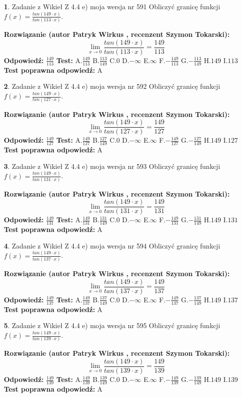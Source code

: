 \documentclass[12pt, a4paper]{article}
\theoremstyle{definition} %
\newtheorem{zad}{}
\newcommand{\zadStart}[1]{\begin{zad}#1\newline}
\newcommand{\zadStop}{\end{zad}}
\newcommand{\rozwStart}[2]{\noindent \textbf{Rozwiązanie (autor #1 , recenzent #2): }\newline}
\newcommand{\rozwStop}{\newline}
\newcommand{\odpStart}{\noindent \textbf{Odpowiedź:}\newline}
\newcommand{\odpStop}{\newline}
\newcommand{\testStart}{\noindent \textbf{Test:}\newline}
\newcommand{\testStop}{\newline}
\newcommand{\kluczStart}{\noindent \textbf{Test poprawna odpowiedź:}\newline}
\newcommand{\kluczStop}{\newline}
\begin{document}
\zadStart{Zadanie z Wikieł Z 4.4 e) moja wersja nr 591}
Obliczyć granicę funkcji $f(x)=\frac{tan(149\cdot x)}{tan(113\cdot x)}$.
\zadStop
\rozwStart{Patryk Wirkus}{Szymon Tokarski}
$$\lim\limits_{x\to 0}\frac{tan(149\cdot x)}{tan(113\cdot x)}=
\frac{149}{113}$$
\rozwStop
\odpStart
$\frac{149}{113}$
\odpStop
\testStart
A.$\frac{149}{113}$
B.$\frac{113}{149}$
C.$0$
D.$-\infty$
E.$\infty$
F.$-\frac{149}{113}$
G.$-\frac{113}{149}$
H.$149$
I.$113$
\testStop
\kluczStart
A
\kluczStop



\zadStart{Zadanie z Wikieł Z 4.4 e) moja wersja nr 592}
Obliczyć granicę funkcji $f(x)=\frac{tan(149\cdot x)}{tan(127\cdot x)}$.
\zadStop
\rozwStart{Patryk Wirkus}{Szymon Tokarski}
$$\lim\limits_{x\to 0}\frac{tan(149\cdot x)}{tan(127\cdot x)}=
\frac{149}{127}$$
\rozwStop
\odpStart
$\frac{149}{127}$
\odpStop
\testStart
A.$\frac{149}{127}$
B.$\frac{127}{149}$
C.$0$
D.$-\infty$
E.$\infty$
F.$-\frac{149}{127}$
G.$-\frac{127}{149}$
H.$149$
I.$127$
\testStop
\kluczStart
A
\kluczStop



\zadStart{Zadanie z Wikieł Z 4.4 e) moja wersja nr 593}
Obliczyć granicę funkcji $f(x)=\frac{tan(149\cdot x)}{tan(131\cdot x)}$.
\zadStop
\rozwStart{Patryk Wirkus}{Szymon Tokarski}
$$\lim\limits_{x\to 0}\frac{tan(149\cdot x)}{tan(131\cdot x)}=
\frac{149}{131}$$
\rozwStop
\odpStart
$\frac{149}{131}$
\odpStop
\testStart
A.$\frac{149}{131}$
B.$\frac{131}{149}$
C.$0$
D.$-\infty$
E.$\infty$
F.$-\frac{149}{131}$
G.$-\frac{131}{149}$
H.$149$
I.$131$
\testStop
\kluczStart
A
\kluczStop



\zadStart{Zadanie z Wikieł Z 4.4 e) moja wersja nr 594}
Obliczyć granicę funkcji $f(x)=\frac{tan(149\cdot x)}{tan(137\cdot x)}$.
\zadStop
\rozwStart{Patryk Wirkus}{Szymon Tokarski}
$$\lim\limits_{x\to 0}\frac{tan(149\cdot x)}{tan(137\cdot x)}=
\frac{149}{137}$$
\rozwStop
\odpStart
$\frac{149}{137}$
\odpStop
\testStart
A.$\frac{149}{137}$
B.$\frac{137}{149}$
C.$0$
D.$-\infty$
E.$\infty$
F.$-\frac{149}{137}$
G.$-\frac{137}{149}$
H.$149$
I.$137$
\testStop
\kluczStart
A
\kluczStop



\zadStart{Zadanie z Wikieł Z 4.4 e) moja wersja nr 595}
Obliczyć granicę funkcji $f(x)=\frac{tan(149\cdot x)}{tan(139\cdot x)}$.
\zadStop
\rozwStart{Patryk Wirkus}{Szymon Tokarski}
$$\lim\limits_{x\to 0}\frac{tan(149\cdot x)}{tan(139\cdot x)}=
\frac{149}{139}$$
\rozwStop
\odpStart
$\frac{149}{139}$
\odpStop
\testStart
A.$\frac{149}{139}$
B.$\frac{139}{149}$
C.$0$
D.$-\infty$
E.$\infty$
F.$-\frac{149}{139}$
G.$-\frac{139}{149}$
H.$149$
I.$139$
\testStop
\kluczStart
A
\kluczStop
\end{document}
